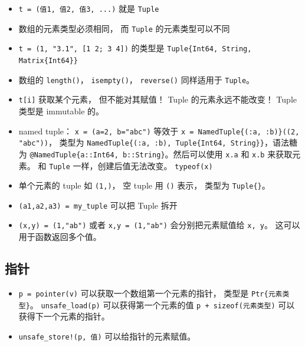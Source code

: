 \begin{itemize}
\item \verb`t = (值1, 值2, 值3, ...)` 就是 \verb`Tuple`
\item 数组的元素类型必须相同， 而 \verb`Tuple` 的元素类型可以不同
\item \verb`t = (1, "3.1", [1 2; 3 4])` 的类型是 \verb`Tuple{Int64, String, Matrix{Int64}}`
\item 数组的 \verb`length()`， \verb`isempty()`， \verb`reverse()` 同样适用于 \verb`Tuple`。
\item \verb`t[i]` 获取某个元素， 但不能对其赋值！ Tuple 的元素永远不能改变！ Tuple 类型是 immutable 的。
\item named tuple： \verb`x = (a=2, b="abc")` 等效于 \verb`x = NamedTuple{(:a, :b)}((2, "abc"))`， 类型为 \verb`NamedTuple{(:a, :b), Tuple{Int64, String}}`，语法糖为 \verb`@NamedTuple{a::Int64, b::String}`。然后可以使用 \verb`x.a` 和 \verb`x.b` 来获取元素。 和 \verb`Tuple` 一样，创建后值无法改变。 \verb`typeof(x)` 
\item 单个元素的 tuple 如 \verb`(1,)`， 空 tuple 用 \verb`()` 表示， 类型为 \verb`Tuple{}`。
\item \verb`(a1,a2,a3) = my_tuple` 可以把 Tuple 拆开
\item \verb`(x,y) = (1,"ab")` 或者 \verb`x,y = (1,"ab")` 会分别把元素赋值给 \verb`x, y`。 这可以用于函数返回多个值。
\end{itemize}

\subsection{指针}
\begin{itemize}
\item \verb`p = pointer(v)` 可以获取一个数组第一个元素的指针， 类型是 \verb`Ptr{元素类型}`。 \verb`unsafe_load(p)` 可以获得第一个元素的值 \verb`p + sizeof(元素类型)` 可以获得下一个元素的指针。
\item \verb`unsafe_store!(p, 值)` 可以给指针的元素赋值。
\end{itemize}


